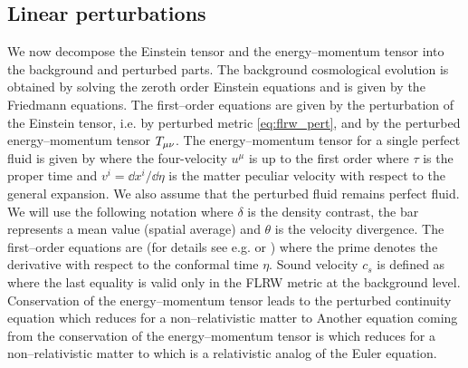 \subsection{Linear perturbations}
We now decompose the Einstein tensor and the energy--momentum tensor into the background and perturbed parts. The background cosmological evolution is obtained by solving the zeroth order Einstein equations and is given by the Friedmann equations. The first--order equations are given by the perturbation of the Einstein tensor, i.e. by perturbed metric \eqref{eq:flrw_pert}, and by the perturbed energy--momentum tensor $T_{\mu\nu}$. The energy--momentum tensor for a single perfect fluid is given by
where the four-velocity $u^\mu$ is up to the first order
where $\tau$ is the proper time and $v^i=\dd x^i/\dd\eta$ is the matter peculiar velocity with respect to the general expansion. We also assume that the perturbed fluid remains perfect fluid. We will use the following notation
where $\delta$ is the density contrast, the bar represents a mean value (spatial average) and $\theta$ is the velocity divergence. The first--order equations are (for details see e.g. \cite{2002col.luc..cosmology} or \cite{10.1143/PTPS.78.1})
where the prime denotes the derivative with respect to the conformal time $\eta$. Sound velocity $c_s$ is defined as
where the last equality is valid only in the FLRW metric at the background level. Conservation of the energy--momentum tensor leads to the perturbed continuity equation
which reduces for a non--relativistic matter to
Another equation coming from the conservation of the energy--momentum tensor is
which reduces for a non--relativistic matter to
which is a relativistic analog of the Euler equation.


